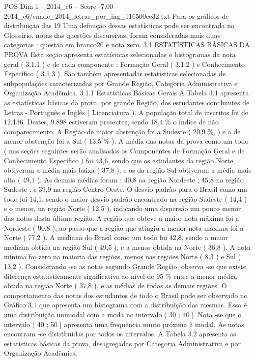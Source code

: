 \begin{textsample}{POS Dim 1 – 2014\_c6 – Score -7.00 – 2014\_c6/enade\_2014\_letras\_por\_ing\_116500ce32.txt}
Para os gráficos de distribuição das 19 Uma definição dessas estatísticas pode ser encontrada no Glossário. notas das questões discursivas, foram consideradas mais duas categorias : questão em branco20 e nota zero. 3.1 ESTATÍSTICAS BÁSICAS DA PROVA Esta seção apresenta estatísticas selecionadas e histogramas da nota geral ( 3.1.1 ) e de cada componente : Formação Geral ( 3.1.2 ) e Conhecimento Específico ( 3.1.3 ).
São também apresentadas estatísticas selecionadas de subpopulações caracterizadas por Grande Região, Categoria Administrativa e Organização Acadêmica. 3.1.1 Estatísticas Básicas Gerais A Tabela 3.1 apresenta as estatísticas básicas da prova, por grande Região, dos estudantes concluintes de Letras - Português e Inglês ( Licenciatura ).
A população total de inscritos foi de 12.136.
Destes, 9.898 estiveram presentes, sendo 18,4 \% o índice de não comparecimento.
A Região de maior abstenção foi a Sudeste ( 20,9 \%, ) e a de menor abstenção foi a Sul ( 13,5 \% ).
A média das notas da prova como um todo ( nas seções seguintes serão analisados os Componentes de Formação Geral e de Conhecimento Específico ) foi 43,6, sendo que os estudantes da região Norte obtiveram a média mais baixa ( 37,8 ), e os da região Sul obtiveram a média mais alta ( 49,1 ).
As demais médias foram : 40,8 na região Nordeste ; 45,8 na região Sudeste ; e 39,9 na região Centro-Oeste.
O desvio padrão para o Brasil como um todo foi 14,1, sendo o maior desvio padrão encontrado na região Sudeste ( 14,4 ) e o menor, na região Norte ( 12,5 ), indicando uma dispersão um pouco menor das notas desta última região.
A região que obteve a maior nota máxima foi a Nordeste ( 90,8 ), ao passo que a região que atingiu a menor nota máxima foi a Norte ( 77,2 ).
A mediana do Brasil como um todo foi 42,8, sendo a maior mediana obtida na região Sul ( 49,5 ), e a menor obtida na Norte ( 36,8 ).
A nota mínima foi zero na maioria das regiões, menos nas regiões Norte ( 8,3 ) e Sul ( 13,2 ).
Considerando -se as notas segundo Grande Região, observa -se que existe diferença estatisticamente significativa ao nível de 95 \% entre a menor média, obtida na região Norte ( 37,8 ), e as médias de todas as demais regiões.
O comportamento das notas dos estudantes de todo o Brasil pode ser observado no Gráfico 3.1 que apresenta um histograma com a distribuição das mesmas.
Essa é uma distribuição unimodal com a moda no intervalo ( 30 ; 40 ].
Nota -se que o intervalo ( 40 ; 50 ] apresenta uma frequência muito próxima à modal.
As notas encontram -se distribuídas por todos os intervalos.
A Tabela 3.2 apresenta as estatísticas básicas da prova, desagregadas por Categoria Administrativa e por Organização Acadêmica.

\end{textsample}
